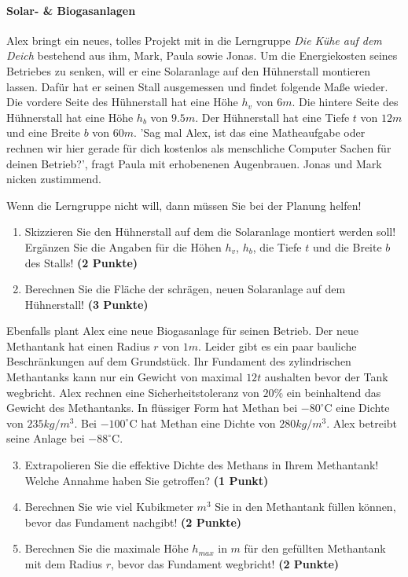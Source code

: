 \documentclass[a4paper, 9pt]{scrartcl}\usepackage[]{graphicx}\usepackage[]{xcolor}
\begin{document}
\paragraph{Solar- \& Biogasanlagen}



Alex bringt ein neues, tolles Projekt mit in die Lerngruppe \textit{Die Kühe auf dem Deich} bestehend aus ihm, Mark, Paula sowie Jonas. Um die Energiekosten seines Betriebes zu senken, will er eine Solaranlage auf den Hühnerstall montieren lassen. Dafür hat er seinen Stall ausgemessen und findet folgende Maße wieder. Die vordere Seite des Hühnerstall hat eine Höhe $h_v$ von $6m$. Die hintere Seite des Hühnerstall hat eine Höhe $h_b$ von $9.5m$. Der Hühnerstall hat eine Tiefe $t$ von $12m$ und eine Breite $b$ von $60m$. 'Sag mal Alex, ist das eine Matheaufgabe oder rechnen wir hier gerade für dich kostenlos als menschliche Computer Sachen für deinen Betrieb?', fragt Paula mit erhobenenen Augenbrauen. Jonas und Mark nicken zustimmend.

\vspace{1Ex}

Wenn die Lerngruppe nicht will, dann müssen Sie bei der Planung helfen!

\begin{enumerate}
\item Skizzieren Sie den Hühnerstall auf dem die Solaranlage montiert werden soll! Ergänzen Sie die Angaben für die Höhen $h_v$, $h_b$, die Tiefe $t$ und die Breite $b$ des Stalls!  \textbf{(2 Punkte)}
\item Berechnen Sie die Fläche der schrägen, neuen Solaranlage auf dem Hühnerstall! \textbf{(3 Punkte)}
\end{enumerate}

Ebenfalls plant Alex eine neue Biogasanlage für seinen Betrieb. Der neue Methantank hat einen Radius $r$ von $1m$. Leider gibt es ein paar bauliche Beschränkungen auf dem Grundstück. Ihr Fundament des
zylindrischen Methantanks kann nur ein Gewicht von maximal $12t$ aushalten bevor der Tank wegbricht. Alex rechnen eine Sicherheitstoleranz von $20\%$ ein beinhaltend das Gewicht des
Methantanks. In flüssiger Form hat Methan bei $-80^\circ\text{C}$ eine Dichte von $235kg/m^3$. Bei $-100^\circ\text{C}$ hat Methan eine Dichte von $280kg/m^3$. Alex betreibt seine Anlage bei $-88^\circ\text{C}$.

\begin{enumerate}
  \setcounter{enumi}{2}
\item Extrapolieren Sie die effektive Dichte des Methans in Ihrem Methantank! Welche Annahme haben Sie getroffen? \textbf{(1 Punkt)}
\item Berechnen Sie wie viel Kubikmeter $m^3$ Sie in den Methantank füllen können, bevor das Fundament nachgibt! \textbf{(2 Punkte)}
\item Berechnen Sie die maximale Höhe $h_{max}$ in $m$ für den gefüllten Methantank mit dem Radius $r$, bevor das Fundament wegbricht! \textbf{(2 Punkte)}
\end{enumerate}
\end{document}
